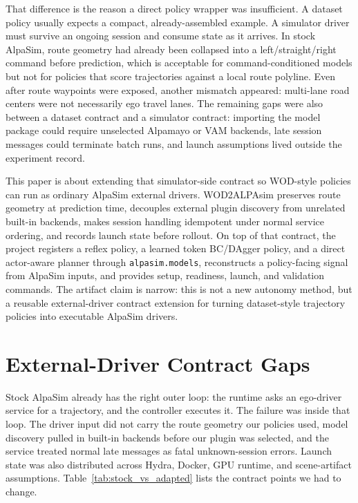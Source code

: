 \documentclass{article}
\begin{document}
That difference is the reason a direct policy wrapper was insufficient. A dataset policy
usually expects a compact, already-assembled example. A simulator driver must survive an
ongoing session and consume state as it arrives. In stock AlpaSim, route geometry had
already been collapsed into a left/straight/right command before prediction, which is
acceptable for command-conditioned models but not for policies that score trajectories
against a local route polyline. Even after route waypoints were exposed, another mismatch
appeared: multi-lane road centers were not necessarily ego travel lanes. The remaining
gaps were also between a dataset contract and a simulator contract: importing the model
package could require unselected Alpamayo or VAM backends, late session messages could
terminate batch runs, and launch assumptions lived outside the experiment record.

This paper is about extending that simulator-side contract so WOD-style policies can run
as ordinary AlpaSim external drivers. WOD2ALPAsim preserves route geometry at
prediction time, decouples external plugin discovery from unrelated built-in backends,
makes session handling idempotent under normal service ordering, and records launch state
before rollout. On top of that contract, the project registers a reflex policy, a learned
token BC/DAgger policy, and a direct actor-aware planner through
\texttt{alpasim.models}, reconstructs a policy-facing signal from AlpaSim inputs, and
provides setup, readiness, launch, and validation commands. The artifact claim is narrow:
this is not a new autonomy method, but a reusable external-driver contract extension for
turning dataset-style trajectory policies into executable AlpaSim drivers.

\section{External-Driver Contract Gaps}

Stock AlpaSim already has the right outer loop: the runtime asks an ego-driver service
for a trajectory, and the controller executes it. The failure was inside that loop. The
driver input did not carry the route geometry our policies used, model discovery pulled
in built-in backends before our plugin was selected, and the service treated normal late
messages as fatal unknown-session errors. Launch state was also distributed across
Hydra, Docker, GPU runtime, and scene-artifact assumptions. Table~\ref{tab:stock_vs_adapted}
lists the contract points we had to change.
\end{document}
